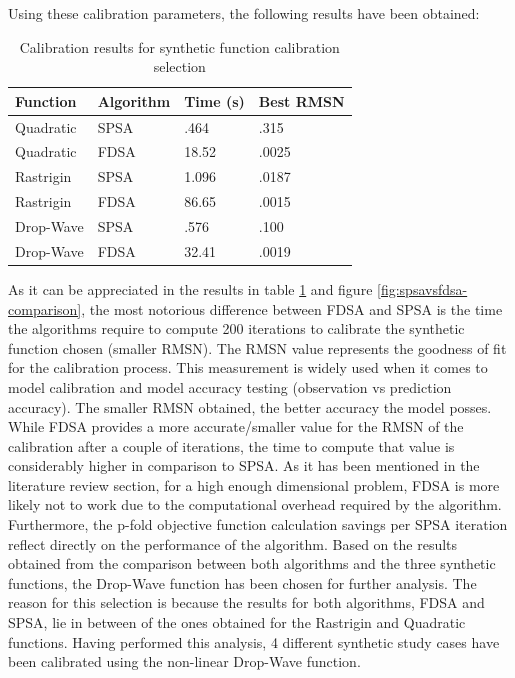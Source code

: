 Using these calibration parameters, the following results have been obtained:

\begin{table}[htpb]
  \centering
  \begin{tabular}{l l l l}
    \toprule
      Function & Algorithm & Time (s) & Best RMSN \\
    \midrule
      Quadratic & SPSA & .464 & .315  \\
      Quadratic & FDSA & 18.52 & .0025  \\
      Rastrigin & SPSA & 1.096 & .0187  \\
      Rastrigin & FDSA & 86.65 & .0015  \\
      Drop-Wave & SPSA & .576 & .100  \\
      Drop-Wave & FDSA & 32.41 & .0019  \\
    \bottomrule
  \end{tabular}
  \caption[Calibration Results]{Calibration results for synthetic function calibration selection}
  \label{tab:calibration-results}
\end{table}

As it can be appreciated in the results in table \ref{tab:calibration-results} and figure \ref{fig:spsavsfdsa-comparison}, the most notorious difference between FDSA and SPSA is the time the algorithms require to compute 200 iterations to calibrate the synthetic function chosen (smaller RMSN). The RMSN value represents the goodness of fit for the calibration process. This measurement is widely used when it comes to model calibration and model accuracy testing (observation vs prediction accuracy). The smaller RMSN obtained, the better accuracy the model posses. 
\vskip 0.2in
While FDSA provides a more accurate/smaller value for the RMSN of the calibration after a couple of iterations, the time to compute that value is considerably higher in comparison to SPSA. As it has been mentioned in the literature review section, for a high enough dimensional problem, FDSA is more likely not to work due to the computational overhead required by the algorithm. Furthermore, the p-fold objective function calculation savings per SPSA iteration reflect directly on the performance of the algorithm. 
\vskip 0.2in
Based on the results obtained from the comparison between both algorithms and the three synthetic functions, the Drop-Wave function has been chosen for further analysis. The reason for this selection is because the results for both algorithms, FDSA and SPSA, lie in between of the ones obtained for the Rastrigin and Quadratic functions. Having performed this analysis, 4 different synthetic study cases have been calibrated using the non-linear Drop-Wave function.

